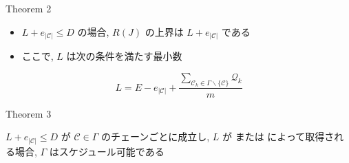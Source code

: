 \begin{frame}[label=theorem2]{Theorem 2}
    \begin{theorem}[]
        \begin{itemize}
            \item $L+e_{|\mathcal{C}|} \leq D$ の場合, $R(J)$ の上界は $L+e_{|\mathcal{C}|}$ である
            \item ここで, $L$ は次の条件を満たす最小数
        \end{itemize}
        \vspace{3mm}
        \begin{equation*}
            L=E-e_{|\mathcal{C}|}+\frac{\sum_{\mathcal{C}_{k} \in \Gamma \backslash\{\mathcal{C}\}} \mathcal{Q}_{k}}{m}
        \end{equation*}
    \end{theorem}
\end{frame}

\begin{frame}[label=theorem3]{Theorem 3}
    \begin{theorem}[]
        $L+e_{|\mathcal{C}|} \leq D$ が $\mathcal{C} \in \Gamma$ のチェーンごとに成立し, $L$ が  または  によって取得される場合, $\Gamma$ はスケジュール可能である
    \end{theorem}
\end{frame}
